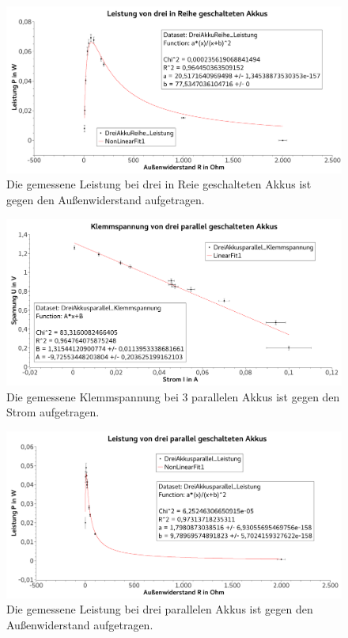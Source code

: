 \documentclass[
	a4paper,
	12pt,
	pagesize,
	ngerman
]{scrartcl}
\begin{document}
	\begin{figure}[tb]
		\includegraphics[width=1\textwidth]{Leistung3Reihe}
		\centering
		\caption{Die gemessene Leistung bei drei in Reie geschalteten Akkus ist gegen den Außenwiderstand aufgetragen.}
		\label{Leistung3Reihe}
		\centering
	\end{figure}
	
	\begin{figure}[tb]
		\includegraphics[width=1\textwidth]{Spannung3Parallel}
		\centering
		\caption{Die gemessene Klemmspannung bei 3 parallelen Akkus ist gegen den Strom aufgetragen.}
		\label{Spannung3Parallel}
		\centering
	\end{figure}

	\begin{figure}[tb]
		\includegraphics[width=1\textwidth]{Leistung3Parallel}
		\centering
		\caption{Die gemessene Leistung bei drei parallelen Akkus ist gegen den Außenwiderstand aufgetragen.}
		\label{Leistung3Parallel}
		\centering
	\end{figure}
\end{document}
